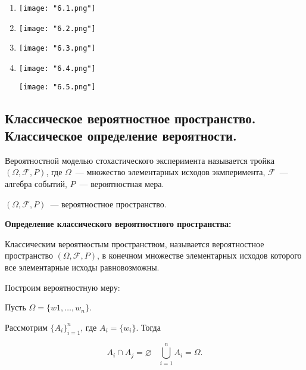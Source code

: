     \begin{enumerate}
        \item{
        \begin{center}
            \texttt{[image: "6.1.png"]}
        \end{center}
        }
        \item{
        \begin{center}
            \texttt{[image: "6.2.png"]}
        \end{center}
        }
        \item{
        \begin{center}
            \texttt{[image: "6.3.png"]}
        \end{center}
        }
        \item{
        \begin{center}
            \texttt{[image: "6.4.png"]}

            \texttt{[image: "6.5.png"]}
        \end{center}
        }
    \end{enumerate}

\subsection{Классическое вероятностное пространство. Классическое определение
вероятности.}

Вероятностной моделью стохастического эксперимента называется тройка
$(\Omega, \mathcal{F}, P)$, где $\Omega$~--- множество элементарных
исходов экмперимента, $\mathcal{F}$~--- алгебра событий, 
$P$~--- вероятностная мера.

$(\Omega, \mathcal{F}, P)$~--- вероятностное пространство.
\bigskip

\textbf{Определение классического вероятностного пространства:}
    \smallskip

    Классическим вероятностым пространством, называется вероятностное
    пространство $(\Omega, \mathcal{F}, P)$, в конечном множестве 
    элементарных исходов которого все элементарные исходы равновозможны.
    \bigskip

    Построим вероятностную меру:
    \bigskip

    Пусть $\Omega = \{w1, \dots, w_n\}$.

    Рассмотрим $\{ A_i \}^{n}_{i = 1}$, где $A_i = \{w_i\}$. Тогда

    \[
        A_i \cap A_j = \varnothing \;\;\; \bigcup^{n}_{i = 1} A_i = \Omega.  
    \]

